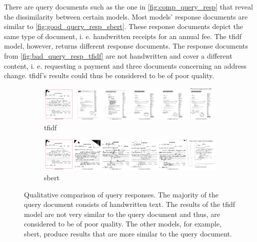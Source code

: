 There are query documents such as the one in \autoref{fig:comp_query_resp} that reveal the dissimilarity between certain models.
Most models' response documents are similar to \autoref{fig:good_query_resp_sbert}.
These response documents depict the same type of document, i. e. handwritten receipts for an annual fee.
The \ac{tfidf} model, however, returns different response documents.
The response documents from \autoref{fig:bad_query_resp_tfidf} are not handwritten and cover a different content, 
i. e. requesting a payment and three documents concerning an address change.
\ac{tfidf}'s results could thus be considered to be of poor quality.

\begin{figure}[h!]
    \ContinuedFloat
    \begin{subfigure}{\textwidth}
        \centering
        \includegraphics[width=1\textwidth]{images/query_results/4542b223317eba23e4bda3e1536d61c8e2d2890a6439830ca8c62650bc1aac70/Most_similar_images_found_by_tfidf.pdf}
        \caption{\ac{tfidf}}
        \label{fig:bad_query_resp_tfidf}
    \end{subfigure}

    \begin{subfigure}{\textwidth}
        \centering
        \includegraphics[width=1\textwidth]{images/query_results/4542b223317eba23e4bda3e1536d61c8e2d2890a6439830ca8c62650bc1aac70/Most_similar_images_found_by_hugging.pdf}
        \caption{\ac{sbert}}
        \label{fig:good_query_resp_sbert}
    \end{subfigure}

\caption[Qualitative comparison of query responses]{Qualitative comparison of query responses.
The majority of the query document consists of handwritten text.
The results of the \ac{tfidf} model are not very similar to the query document and thus, are considered to be of poor quality.
The other models, for example, \ac{sbert}, produce results that are more similar to the query document.
}
\label{fig:comp_query_resp}
\end{figure}

